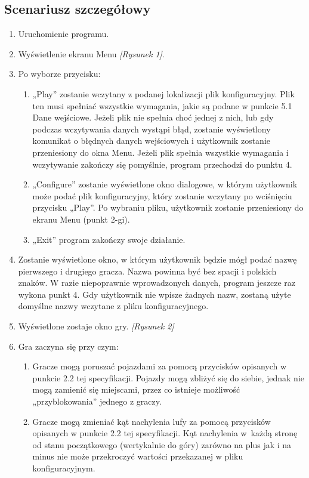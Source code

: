 \documentclass[12pt]{report}
\begin{document}
\subsection{Scenariusz szczegółowy}
\begin{enumerate}
\item Uruchomienie programu.
\item Wyświetlenie ekranu Menu \textit{[Rysunek 1]}.
\item Po wyborze przycisku: 
\begin{enumerate}
    \item „Play” zostanie wczytany z podanej lokalizacji plik konfiguracyjny. Plik ten musi spełniać wszystkie wymagania, jakie są podane w punkcie 5.1 Dane wejściowe. Jeżeli plik nie spełnia choć jednej z nich, lub gdy podczas wczytywania danych wystąpi błąd, zostanie wyświetlony komunikat o błędnych danych wejściowych i użytkownik zostanie przeniesiony do okna Menu. Jeżeli plik spełnia wszystkie wymagania i wczytywanie zakończy się pomyślnie, program przechodzi do punktu 4. 
    \item „Configure” zostanie wyświetlone okno dialogowe, w którym użytkownik może podać plik konfiguracyjny, który zostanie wczytany po wciśnięciu przycisku „Play”. Po wybraniu pliku, użytkownik zostanie przeniesiony do ekranu Menu (punkt 2-gi). 
    \item „Exit” program zakończy swoje działanie.
\end{enumerate}
\item Zostanie wyświetlone okno, w którym użytkownik będzie mógł podać nazwę pierwszego i drugiego gracza. Nazwa powinna być bez spacji i polskich znaków. W razie niepoprawnie wprowadzonych danych, program jeszcze raz wykona punkt 4. Gdy użytkownik nie wpisze żadnych nazw, zostaną użyte domyślne nazwy wczytane z pliku konfiguracyjnego. 
\item Wyświetlone zostaje okno gry. \textit{[Rysunek 2]}
\item Gra zaczyna się przy czym: 
\begin{enumerate}
    \item Gracze mogą poruszać pojazdami za pomocą przycisków opisanych w punkcie 2.2 tej specyfikacji. Pojazdy mogą zbliżyć się do siebie, jednak nie mogą zamienić się miejscami, przez co istnieje możliwość „przyblokowania” jednego z graczy. 
    \item Gracze mogą zmieniać kąt nachylenia lufy za pomocą przycisków opisanych w punkcie 2.2 tej specyfikacji. Kąt nachylenia w~każdą stronę od stanu początkowego (wertykalnie do góry) zarówno na plus jak i na minus nie może przekroczyć wartości przekazanej w pliku konfiguracyjnym. 

\end{enumerate}
\end{enumerate}
\end{document}
